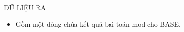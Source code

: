 DỮ LIỆU RA  
\begin{itemize}
	\item     Gồm một dòng chứa kết quả bài toán mod cho BASE.   
\end{itemize}